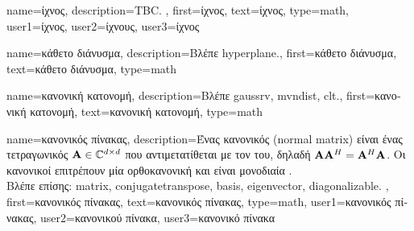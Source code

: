{name={\foreignlanguage{greek}{ίχνος}},
 	description={TBC. },
    	first={\foreignlanguage{greek}{ίχνος}},
    	text={\foreignlanguage{greek}{ίχνος}},
	type=math,
	user1={\foreignlanguage{greek}{ίχνος}}, %
  	user2={\foreignlanguage{greek}{ίχνους}}, %
	user3={\foreignlanguage{greek}{ίχνος}} %
}

{name={\foreignlanguage{greek}{κάθετο διάνυσμα}},
	description={\foreignlanguage{greek}{Βλέπε} \gls{hyperplane}.},
	first={\foreignlanguage{greek}{κάθετο διάνυσμα}},
	text={\foreignlanguage{greek}{κάθετο διάνυσμα}},
	type=math
}

{name={\foreignlanguage{greek}{κανονική κατονομή}}, 
	description={\foreignlanguage{greek}{Βλέπε} \gls{gaussrv}, \gls{mvndist}, \gls{clt}.},
 	first={\foreignlanguage{greek}{κανονική κατονομή}},
 	text={\foreignlanguage{greek}{κανονική κατονομή}},
	type=math
}

{name={\foreignlanguage{greek}{κανονικός πίνακας}},
	description={\foreignlanguage{greek}{Ένας κανονικός}  (normal matrix) \foreignlanguage{greek}{είναι ένας 
		τετραγωνικός}  ${\bf A} \in \mathbb{C}^{d \times d}$ 
                 \foreignlanguage{greek}{που αντιμετατίθεται με τον}  \foreignlanguage{greek}{του, 
                 δηλαδή ${\bf A}{\bf A}^{H}={\bf A}^{H}{\bf A}$. Οι κανονικοί}  
		\foreignlanguage{greek}{επιτρέπουν μία ορθοκανονική}   \foreignlanguage{greek}{και είναι 
		μονοδιαία} .
                 \\
                 \foreignlanguage{greek}{Βλέπε επίσης:} \gls{matrix}, \gls{conjugatetranspose}, \gls{basis}, \gls{eigenvector}, \gls{diagonalizable}. },
	first={\foreignlanguage{greek}{κανονικός πίνακας}},
	text={\foreignlanguage{greek}{κανονικός πίνακας}},
	type=math,
	user1={\foreignlanguage{greek}{κανονικός πίνακας}}, %
	user2={\foreignlanguage{greek}{κανονικού πίνακα}}, %
	user3={\foreignlanguage{greek}{κανονικό πίνακα}} %
}

